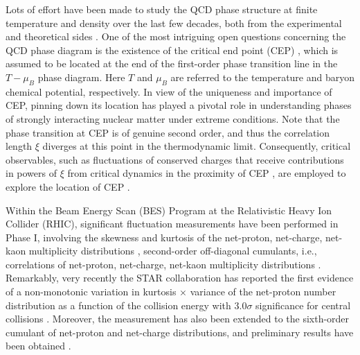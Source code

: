 \documentclass[%
reprint,
superscriptaddress,
showpacs,preprintnumbers,
 amsmath,amssymb,
 aps,
prd,
]{revtex4-1}
\begin{document}
Lots of effort have been made to study the QCD phase structure at finite temperature and density over the last few decades, both from the experimental and theoretical sides \cite{Luo:2017faz,Bzdak:2019pkr,Fischer:2018sdj,Fu:2019hdw}. One of the most intriguing open questions concerning the QCD phase diagram is the existence of the critical end point (CEP) \cite{Stephanov:2007fk}, which is assumed to be located at the end of the first-order phase transition line in the $T-\mu_B$ phase diagram. Here $T$ and $\mu_B$ are referred to the temperature and baryon chemical potential, respectively. In view of the uniqueness and importance of CEP, pinning down its location has played a pivotal role in understanding phases of strongly interacting nuclear matter under extreme conditions. Note that the phase transition at CEP is of genuine second order, and thus the correlation length $\xi$ diverges at this point in the thermodynamic limit. Consequently, critical observables, such as fluctuations of conserved charges that receive contributions in powers of $\xi$ from critical dynamics in the proximity of CEP \cite{Stephanov:2008qz}, are employed to explore the location of CEP \cite{Luo:2017faz,Adam:2020unf}.

Within the Beam Energy Scan (BES) Program at the Relativistic Heavy Ion Collider (RHIC), significant fluctuation measurements have been performed in Phase I, involving the skewness and kurtosis of the net-proton, net-charge, net-kaon multiplicity distributions \cite{Adamczyk:2013dal,Adamczyk:2014fia,Luo:2015ewa,Adamczyk:2017wsl}, second-order off-diagonal cumulants, i.e., correlations of net-proton, net-charge, net-kaon multiplicity distributions \cite{Adam:2019xmk}. Remarkably, very recently the STAR collaboration has reported the first evidence of a non-monotonic variation in kurtosis $\times$ variance of the net-proton number distribution as a function of the collision energy with $3.0\sigma$ significance for central collisions \cite{Adam:2020unf}. Moreover, the measurement has also been extended to the sixth-order cumulant of net-proton and net-charge distributions, and preliminary results have been obtained \cite{Nonaka:2020crv,Pandav:2020uzx}.
\end{document}
